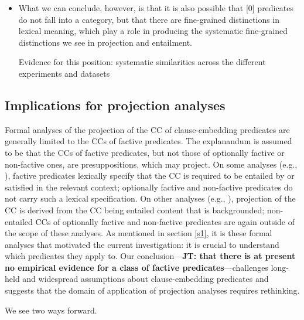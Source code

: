 \documentclass[11pt,fleqn]{article}
\newcommand{\6}{\mbox{$[\hspace*{-.6mm}[$}}
\newcommand{\9}{\mbox{$]\hspace*{-.6mm}]$}}
\newcommand{\jt}[1]{\textbf{\color{blue}JT: #1}}
\begin{document}
\begin{itemize}
\item What we can conclude, however, is that it is also possible that [0] predicates do not fall into a category, but that there are fine-grained distinctions in lexical meaning, which play a role in producing the systematic fine-grained distinctions we see in projection and entailment.

Evidence for this position: systematic similarities across the different experiments and datasets

\end{itemize}

\subsection{Implications for projection analyses}\label{s42}

Formal analyses of the projection of the CC of clause-embedding predicates are generally limited to the CCs of factive predicates. The explanandum is assumed to be that the CCs of factive predicates, but not those of optionally factive or non-factive ones, are presuppositions, which may project. On some analyses (e.g., \citealt{heim83,vds92}), factive predicates lexically specify that the CC is required to be entailed by or satisfied in the relevant context; optionally factive and non-factive predicates do not carry such a lexical specification. On other analyses (e.g., \citealt{abrusan2011,abrusan2016,romoli2015,best-question}), projection of the CC is derived from the CC being entailed content that is backgrounded; non-entailed CCs of optionally factive and non-factive predicates are again outside of the scope of these analyses. As mentioned in section \ref{s1}, it is these formal analyses that motivated the current investigation: it is crucial to understand which predicates they apply to. Our conclusion---\jt{that there is at present no empirical evidence for a class of factive predicates}---challenges long-held and widespread assumptions about clause-embedding predicates and suggests that the domain of application of projection analyses requires rethinking.

We see two ways forward. 
\end{document}
